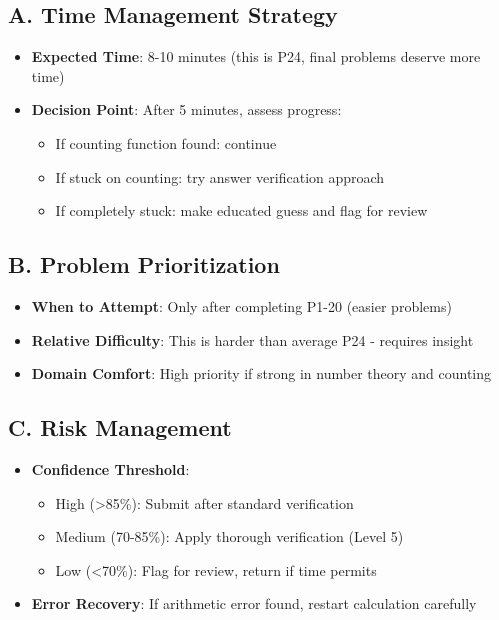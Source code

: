 \documentclass[11pt]{article}
\begin{document}
\begin{competitionbox}
\subsection*{A. Time Management Strategy}
\begin{itemize}[leftmargin=*]
    \item \textbf{Expected Time}: 8-10 minutes (this is P24, final problems deserve more time)
    \item \textbf{Decision Point}: After 5 minutes, assess progress:
    \begin{itemize}
        \item If counting function found: continue
        \item If stuck on counting: try answer verification approach
        \item If completely stuck: make educated guess and flag for review
    \end{itemize}
\end{itemize}

\subsection*{B. Problem Prioritization}
\begin{itemize}[leftmargin=*]
    \item \textbf{When to Attempt}: Only after completing P1-20 (easier problems)
    \item \textbf{Relative Difficulty}: This is harder than average P24 - requires insight
    \item \textbf{Domain Comfort}: High priority if strong in number theory and counting
\end{itemize}

\subsection*{C. Risk Management}
\begin{itemize}[leftmargin=*]
    \item \textbf{Confidence Threshold}:
    \begin{itemize}
        \item High (>85\%): Submit after standard verification
        \item Medium (70-85\%): Apply thorough verification (Level 5)
        \item Low (<70\%): Flag for review, return if time permits
    \end{itemize}
    \item \textbf{Error Recovery}: If arithmetic error found, restart calculation carefully
\end{itemize}


\end{competitionbox}
\end{document}
